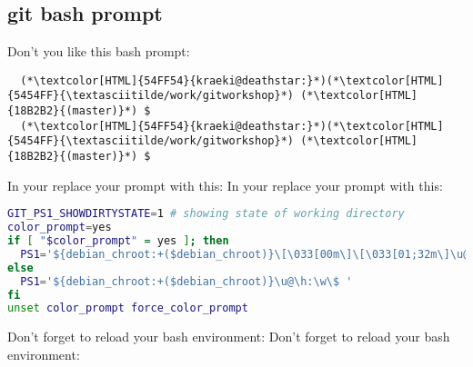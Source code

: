 \subsection{git bash prompt}
\begin{frame}[fragile]
  \subslidetitle

  Don't you like this bash prompt:
  \begin{lstlisting}
  (*\textcolor[HTML]{54FF54}{kraeki@deathstar:}*)(*\textcolor[HTML]{5454FF}{\textasciitilde/work/gitworkshop}*) (*\textcolor[HTML]{18B2B2}{(master)}*) $
  (*\textcolor[HTML]{54FF54}{kraeki@deathstar:}*)(*\textcolor[HTML]{5454FF}{\textasciitilde/work/gitworkshop}*) (*\textcolor[HTML]{18B2B2}{(master)}*) $
  \end{lstlisting}

  In your  replace your prompt with this:
  In your  replace your prompt with this:
  \begin{lstlisting}[language=bash]
GIT_PS1_SHOWDIRTYSTATE=1 # showing state of working directory
color_prompt=yes
if [ "$color_prompt" = yes ]; then
  PS1='${debian_chroot:+($debian_chroot)}\[\033[00m\]\[\033[01;32m\]\u@\h\[\033[00m\]:\[\033[01;34m\]\w\[\033[00m\]\[\033[0;36m\]$(__git_ps1 " (%s)")\[\033[00m\] \$ '
else
  PS1='${debian_chroot:+($debian_chroot)}\u@\h:\w\$ '
fi
unset color_prompt force_color_prompt
\end{lstlisting}

  Don't forget to reload your bash environment: 
  Don't forget to reload your bash environment: 

\end{frame}
